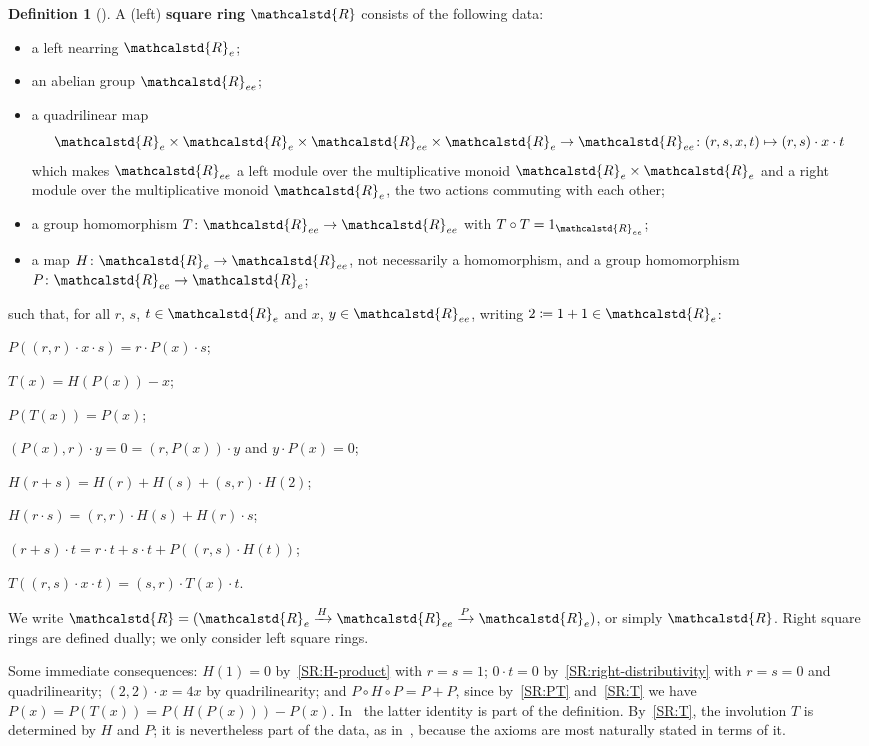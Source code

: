 \documentclass[reqno,a4paper]{amsart}
\theoremstyle{plain}
\theoremstyle{definition}
\newtheorem{definition}[subsection]{Definition}
\newcommand{\defn}{\textbf}
\newcommand{\DefEq}{\coloneq}
\newcommand{\R}{\ensuremath{\mathcalstd{R}}}
\newcommand{\sqring}[4]{\ensuremath{(#1\xrightarrow{#3}#2\xrightarrow{#4}#1)}}
\renewcommand{\Re}{\ensuremath{\R_{e}}}
\newcommand{\Ree}{\ensuremath{\R_{ee}}}
\begin{document}
\begin{definition}[{\cite[Section~7]{BHP}}]\label{def:square-ring}
  A (left) \defn{square ring} \(\R\) consists of the following data:
  \begin{itemize}
    \item a left nearring \(\Re\);
    \item an abelian group \(\Ree\);
    \item a quadrilinear map
          \begin{equation}\label{eq:quadrilinear}
            \Re\times\Re\times\Ree\times\Re\to\Ree\colon (r,s,x,t)\mapsto(r,s)\cdot x\cdot t
          \end{equation}
          which makes \(\Ree\) a left module over the multiplicative monoid \(\Re\times\Re\) and a right module over the multiplicative monoid \(\Re\), the two actions commuting with each other;
    \item a group homomorphism \(T\colon \Ree\to\Ree\) with \(T\circ T=1_{\Ree}\);
    \item a map \(H\colon \Re\to\Ree\), not necessarily a homomorphism, and a group homomorphism \(P\colon \Ree\to\Re\);
  \end{itemize}
  such that, for all \(r\), \(s\), \(t\in\Re\) and \(x\), \(y\in\Ree\), writing \(2\DefEq 1+1\in\Re\):
  \begin{sqaxioms}
    \item\label{SR:P-binatural} \(P((r,r)\cdot x\cdot s)=r\cdot P(x)\cdot s\);
    \item\label{SR:T} \(T(x)=H(P(x))-x\);
    \item\label{SR:PT} \(P(T(x))=P(x)\);
    \item\label{SR:P-kills} \((P(x),r)\cdot y=0=(r,P(x))\cdot y\) and \(y\cdot P(x)=0\);
    \item\label{SR:H-sum} \(H(r+s)=H(r)+H(s)+(s,r)\cdot H(2)\);
    \item\label{SR:H-product} \(H(r\cdot s)=(r,r)\cdot H(s)+H(r)\cdot s\);
    \item\label{SR:right-distributivity} \((r+s)\cdot t=r\cdot t+s\cdot t+P((r,s)\cdot H(t))\);
    \item\label{SR:T-action} \(T((r,s)\cdot x\cdot t)=(s,r)\cdot T(x)\cdot t\).
  \end{sqaxioms}
  We write \(\R=\sqring{\Re}{\Ree}{H}{P}\), or simply \(\R\). Right square rings are defined dually; we only consider left square rings.
\end{definition}

Some immediate consequences: \(H(1)=0\) by~\ref{SR:H-product} with \(r=s=1\); \(0\cdot t=0\) by~\ref{SR:right-distributivity} with \(r=s=0\) and quadrilinearity; \((2,2)\cdot x=4x\) by quadrilinearity; and \(P\circ H\circ P=P+P\), since by~\ref{SR:PT} and~\ref{SR:T} we have \(P(x)=P(T(x))=P(H(P(x)))-P(x)\). In~\cite{BHP} the latter identity is part of the definition. By~\ref{SR:T}, the involution \(T\) is determined by \(H\) and \(P\); it is nevertheless part of the data, as in~\cite{BHP}, because the axioms are most naturally stated in terms of it.
\end{document}
